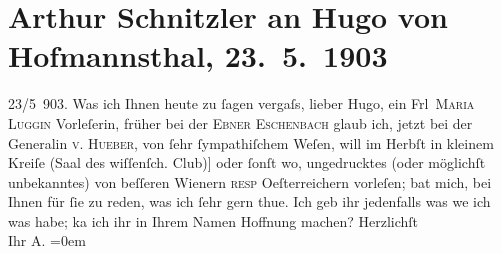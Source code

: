 

         
         \renewcommand{\erwaehntePersonen}{Personen: Marie von Ebner-Eschenbach, Hugo von Hofmannsthal, Henriette von Hueber, Marie Luggin}
         \renewcommand{\erwaehnteOrte}{Orte: Saal des wissenschaftlichen Clubs, Wien, Österreich}
         \renewcommand{\erwaehnteWerke}{}
               \section[Arthur Schnitzler an Hugo von Hofmannsthal, 23. 5. 1903]{ Arthur Schnitzler an Hugo von Hofmannsthal, 23. 5. 1903}\nopagebreak{}\rehead{ }\begin{ledgroupsized}[t]{13cm}\normalsize\beginnumbering \toendnotes[C]{\smallbreak\pagebreak[2]} 
\pstart
           \raggedleft{}{\pb}23/5 903.\pend
           \pstart
           Was ich Ihnen heute zu ſagen vergaſs, lieber Hugo, ein Frl \textsc{Maria Luggin} Vorleſerin, früher bei der \textsc{Ebner Eschenbach} glaub ich, jetzt bei der Generalin \textsc{v. Hueber}, von ſehr ſympathiſchem Weſen, will im Herbſt in kleinem Kreiſe
                  (Saal des wiſſenſch. Club\oindex{Saal des wissenschaftlichen Clubs@\textbf{Saal des wissenschaftlichen Clubs}|pw}{[}){]}{ }{\pb}oder ſonſt wo, ungedrucktes (oder möglichſt unbekanntes)
               von beſſeren Wienern \textsc{resp}{ }Oeſterreichern vorleſen; bat mich, bei Ihnen
               für ſie zu reden, was ich ſehr gern thue. Ich geb ihr jedenfalls was we{\geminationn} ich was habe; ka{\geminationn} ich ihr
               in Ihrem {\pb}Namen Hoffnung machen?\pend
           \pstart
           Herzlichſt{\\[\baselineskip]}Ihr \spacefill\mbox{A.}\pend
           \leftskip=0em{}
         
         \endnumbering{}\end{ledgroupsized}  \newcommand{\dateiname}{L01292}\newcommand{\titel}{Arthur Schnitzler an Hugo von Hofmannsthal, 23. 5. 1903}\newcommand{\editorInnen}{Martin Anton Müller und Gerd-Hermann Susen}
      